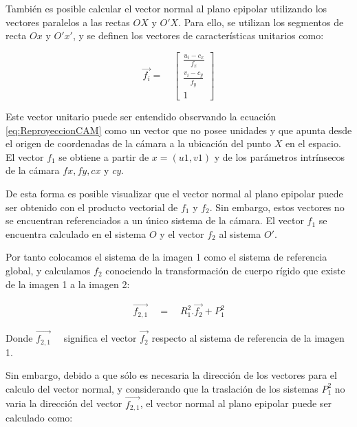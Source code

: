 También es posible calcular el vector normal al plano epipolar utilizando los vectores paralelos a las rectas $OX$ y $O'X$. Para ello, se utilizan los segmentos de recta $Ox$ y $O'x'$, y se definen los vectores de características unitarios como:

\begin{equation}
\overset { \rightarrow  }{ { f }_{ i } } =\quad \left[ \begin{matrix} \frac { u_{ i }-{ c }_{ x } }{ { f }_{ x } }  \\ \frac { { v }_{ i }-{ c }_{ y } }{ { f }_{ y } }  \\ 1 \end{matrix} \right] 
\end{equation}

Este vector unitario puede ser entendido observando la ecuación \ref{eq:ReproyeccionCAM} como un vector que no posee unidades y que apunta desde el origen de coordenadas de la cámara a la ubicación del punto $X$ en el espacio. El vector ${ f }_{ 1}$ se obtiene a partir  de $x = (u1,v1)$  y de los parámetros intrínsecos de la cámara $fx, fy, cx$ y $cy$.

De esta forma es posible visualizar que el vector normal al plano epipolar puede ser obtenido con el producto vectorial de ${ f }_{ 1}$ y ${ f }_{ 2}$. Sin embargo, estos vectores no se encuentran referenciados a un único sistema de la cámara. El vector ${ f }_{ 1}$ se encuentra calculado en el sistema $O$ y el vector ${ f }_{ 2}$ al sistema $O'$. 

Por tanto colocamos el sistema de la imagen 1 como el sistema de referencia global, y calculamos  ${ f }_{ 2}$ 
conociendo la transformación de cuerpo rígido que existe de la imagen 1 a la imagen 2:

\begin{equation}
\begin{matrix} \overset { \rightarrow  }{ { f }_{ 2, 1 } } \quad =\quad { R }_{ 1 }^{ 2 }.\overset { \rightarrow  }{ { f }_{ 2 } } +{ P }_{ 1 }^{ 2 } \end{matrix}
\end{equation}

Donde $\overset { \rightarrow  }{ { f }_{ 2,1} } \quad $ significa el vector $\overset { \rightarrow  }{ { f }_{ 2 } } $ respecto al sistema de referencia de la imagen 1.

Sin embargo, debido a que sólo es necesaria la dirección de los vectores para el calculo del vector normal, y considerando que la traslación de los sistemas ${ P }_{ 1 }^{ 2 }$ no varia la dirección del vector $\overset { \rightarrow  }{ { f }_{ 2, 1 } }$, el vector normal al plano epipolar puede ser calculado como:


